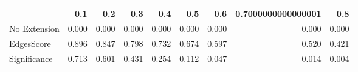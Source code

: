 \begin{tabular}{lrrrrrrrr}
\toprule
{} &   0.1 &   0.2 &   0.3 &   0.4 &   0.5 &   0.6 & 0.7000000000000001 &   0.8 \\
\midrule
No Extension & 0.000 & 0.000 & 0.000 & 0.000 & 0.000 & 0.000 &              0.000 & 0.000 \\
EdgesScore   & 0.896 & 0.847 & 0.798 & 0.732 & 0.674 & 0.597 &              0.520 & 0.421 \\
Significance & 0.713 & 0.601 & 0.431 & 0.254 & 0.112 & 0.047 &              0.014 & 0.004 \\
\bottomrule
\end{tabular}
